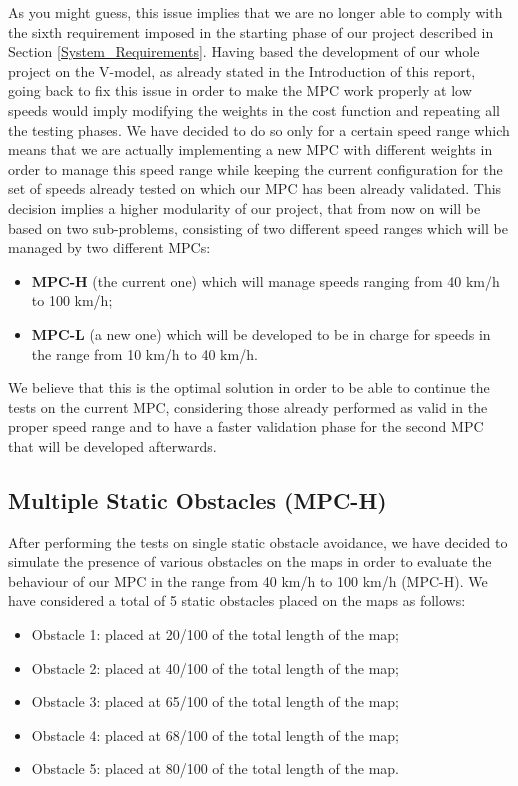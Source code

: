 As you might guess, this issue implies that we are no longer able to comply with the sixth requirement imposed in the starting phase of our project described in Section \ref{System_Requirements}.
Having based the development of our whole project on the V-model, as already stated in the Introduction of this report, going back to fix this issue in order to make the MPC work properly at low speeds would imply modifying the weights in the cost function and repeating all the testing phases.
We have decided to do so only for a certain speed range which means that we are actually implementing a new MPC with different weights in order to manage this speed range while keeping the current configuration for the set of speeds already tested on which our MPC has been already validated.
This decision implies a higher modularity of our project, that from now on will be based on two sub-problems, consisting of two different speed ranges which will be managed by two different MPCs: 
\begin{itemize}
    \item \textbf{MPC-H} (the current one) which will manage speeds ranging from 40 km/h to 100 km/h;
    \item \textbf{MPC-L} (a new one) which will be developed to be in charge for speeds in the range from 10 km/h to 40 km/h.
\end{itemize}

We believe that this is the optimal solution in order to be able to continue the tests on the current MPC, considering those already performed as valid in the proper speed range and to have a faster validation phase for the second MPC that will be developed afterwards.


\subsection{Multiple Static Obstacles (MPC-H)} \label{subsection:multiple_static}
After performing the tests on single static obstacle avoidance, we have decided to simulate the presence of various obstacles on the maps in order to evaluate the behaviour of our MPC in the range from 40 km/h to 100 km/h (MPC-H). We have considered a total of 5 static obstacles placed on the maps as follows:
\begin{itemize}
    \item Obstacle 1: placed at 20/100 of the total length of the map;
    \item Obstacle 2: placed at 40/100 of the total length of the map;
    \item Obstacle 3: placed at 65/100 of the total length of the map;
    \item Obstacle 4: placed at 68/100 of the total length of the map;
    \item Obstacle 5: placed at 80/100 of the total length of the map.
\end{itemize}

